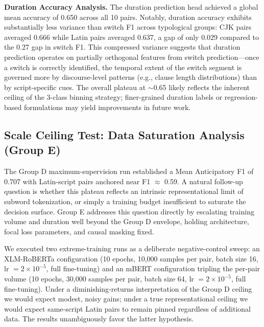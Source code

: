 \documentclass[sigconf,nonacm]{acmart}
\begin{document}
\textbf{Duration Accuracy Analysis.} The duration prediction head achieved a global mean accuracy of 0.650 across all 10 pairs. Notably, duration accuracy exhibits substantially less variance than switch F1 across typological groups: CJK pairs averaged 0.666 while Latin pairs averaged 0.637, a gap of only 0.029 compared to the 0.27 gap in switch F1. This compressed variance suggests that duration prediction operates on partially orthogonal features from switch prediction---once a switch is correctly identified, the temporal extent of the switch segment is governed more by discourse-level patterns (e.g., clause length distributions) than by script-specific cues. The overall plateau at $\sim$0.65 likely reflects the inherent ceiling of the 3-class binning strategy; finer-grained duration labels or regression-based formulations may yield improvements in future work.

\subsection{Scale Ceiling Test: Data Saturation Analysis (Group E)}
The Group D maximum-supervision run established a Mean Anticipatory F1 of 0.707 with Latin-script pairs anchored near F1 $\approx$ 0.59. A natural follow-up question is whether this plateau reflects an intrinsic representational limit of subword tokenization, or simply a training budget insufficient to saturate the decision surface. Group E addresses this question directly by escalating training volume and duration well beyond the Group D envelope, holding architecture, focal loss parameters, and causal masking fixed.

We executed two extreme-training runs as a deliberate negative-control sweep: an XLM-RoBERTa configuration (10 epochs, 10{,}000 samples per pair, batch size 16, lr $= 2 \times 10^{-5}$, full fine-tuning) and an mBERT configuration tripling the per-pair volume (10 epochs, 30{,}000 samples per pair, batch size 64, lr $= 2 \times 10^{-5}$, full fine-tuning). Under a diminishing-returns interpretation of the Group D ceiling we would expect modest, noisy gains; under a true representational ceiling we would expect same-script Latin pairs to remain pinned regardless of additional data. The results unambiguously favor the latter hypothesis.
\end{document}
